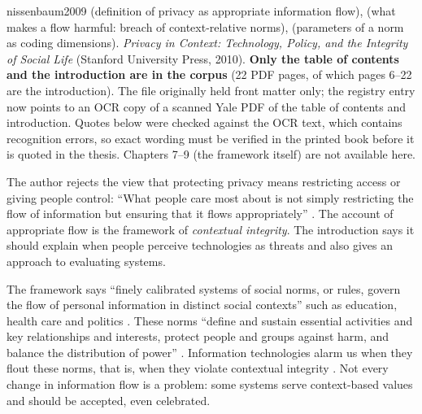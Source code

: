 \begin{papercard}{nissenbaum2009}
  (definition of privacy as appropriate information flow),  (what makes a flow harmful: breach of context-relative norms),  (parameters of a norm as coding dimensions). \emph{Privacy in Context: Technology, Policy, and the Integrity of Social Life} (Stanford University Press, 2010). \textbf{Only the table of contents and the introduction are in the corpus} (22 PDF pages, of which pages 6--22 are the introduction). The file originally held front matter only; the registry entry now points to an OCR copy of a scanned Yale PDF of the table of contents and introduction. Quotes below were checked against the OCR text, which contains recognition errors, so exact wording must be verified in the printed book before it is quoted in the thesis. Chapters 7--9 (the framework itself) are not available here.

 The author rejects the view that protecting privacy means restricting access or giving people control: ``What people care most about is not simply restricting the flow of information but ensuring that it flows appropriately'' . The account of appropriate flow is the framework of \emph{contextual integrity}. The introduction says it should explain when people perceive technologies as threats and also gives an approach to evaluating systems.

 The framework says ``finely calibrated systems of social norms, or rules, govern the flow of personal information in distinct social contexts'' such as education, health care and politics . These norms ``define and sustain essential activities and key relationships and interests, protect people and groups against harm, and balance the distribution of power'' . Information technologies alarm us when they flout these norms, that is, when they violate contextual integrity . Not every change in information flow is a problem: some systems serve context-based values and should be accepted, even celebrated.


\end{papercard}
